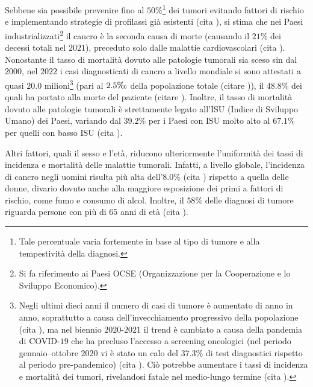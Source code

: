 \documentclass[12pt,a4paper,twoside]{report}
\begin{document}
	Sebbene sia possibile prevenire fino al $50\%$\footnote{Tale percentuale varia fortemente in base al tipo di tumore e alla tempestività della diagnosi.} dei tumori evitando fattori di rischio e implementando strategie di profilassi già esistenti (cita
	), si stima che nei Paesi industrializzati\footnote{Si fa riferimento ai Paesi OCSE (Organizzazione per la Cooperazione e lo Sviluppo Economico).} il cancro è la seconda causa di morte (causando il $21\%$ dei decessi totali nel $2021$), preceduto solo dalle malattie cardiovascolari (cita
	). Nonostante il tasso di mortalità dovuto alle patologie tumorali sia sceso sin dal $2000$, nel $2022$ i casi diagnosticati di cancro a livello mondiale si sono attestati a quasi $20.0$ milioni\footnote{Negli ultimi dieci anni il numero di casi di tumore è aumentato di anno in anno, soprattutto a causa dell'invecchiamento progressivo della popolazione (cita
	), ma nel biennio $2020$-$2021$ il trend è cambiato a causa della pandemia di COVID-$19$ che ha precluso l'accesso a screening oncologici (nel periodo gennaio--ottobre $2020$ vi è stato un calo del $37.3\%$ di test diagnostici rispetto al periodo pre-pandemico) (cita
	). Ciò potrebbe aumentare i tassi di incidenza e mortalità dei tumori, rivelandosi fatale nel medio-lungo termine (cita
	).} (pari al $2.5\tcperthousand$ della popolazione totale (citare %
	)), il $48.8\%$ dei quali ha portato alla morte del paziente (citare
	). Inoltre, il tasso di mortalità dovuto alle patologie tumorali è strettamente legato all'ISU (Indice di Sviluppo Umano) dei Paesi, variando dal $39.2\%$ per i Paesi con ISU molto alto al $67.1\%$ per quelli con basso ISU (cita
	).
	
	Altri fattori, quali il sesso e l'età, riducono ulteriormente l'uniformità dei tassi di incidenza e mortalità delle malattie tumorali. Infatti, a livello globale, l'incidenza di cancro negli uomini risulta più alta dell'$8.0\%$ (cita
	) rispetto a quella delle donne, divario dovuto anche alla maggiore esposizione dei primi a fattori di rischio, come fumo e consumo di alcol. Inoltre, il $58\%$ delle diagnosi di tumore riguarda persone con più di $65$ anni di età (cita
	).
	
\end{document}
